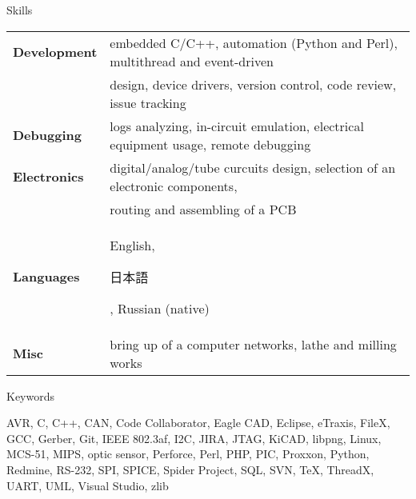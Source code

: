\documentclass{template}
\begin{document}

\begin{rSection}{Skills}

\begin{tabular}{ @{} >{\bfseries}l @{\hspace{6ex}} l }
Development & embedded C/C++, automation (Python and Perl), multithread and event-driven \\
            & design, device drivers, version control, code review, issue tracking \\
Debugging   & logs analyzing, in-circuit emulation, electrical equipment usage, remote debugging \\
Electronics & digital/analog/tube curcuits design, selection of an electronic components, \\
            & routing and assembling of a PCB \\
Languages   & English, \begin{CJK}{UTF8}{min}日本語\end{CJK}, Russian (native) \\
Misc        & bring up of a computer networks, lathe and milling works
\end{tabular}

\end{rSection}


\begin{rSection}{Keywords}

AVR, C, C++, CAN, Code Collaborator, Eagle CAD, Eclipse, eTraxis, FileX, GCC, Gerber, Git, IEEE 802.3af, I2C, JIRA, JTAG, KiCAD, libpng, Linux, MCS-51, MIPS, optic sensor, Perforce, Perl, PHP, PIC, Proxxon, Python, Redmine, RS-232, SPI, SPICE, Spider Project, SQL, SVN, \TeX, ThreadX, UART, UML, Visual Studio, zlib

\end{rSection}

\end{document}
